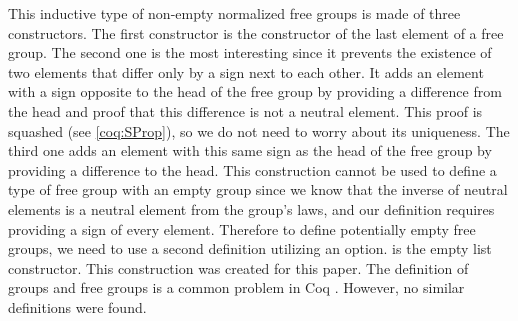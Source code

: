 This inductive type  of non-empty normalized free groups is made of three constructors. The first constructor  is the constructor of the last element of a free group. The second one  is the most interesting since it prevents the existence of two elements that differ only by a sign next to each other. It adds an element with a sign opposite to the head of the free group by providing a difference from the head and proof that this difference is not a neutral element. This proof is squashed (see \ref{coq:SProp}), so we do not need to worry about its uniqueness. The third one adds an element with this same sign as the head of the free group by providing a difference to the head. This construction cannot be used to define a type of free group with an empty group since we know that the inverse of neutral elements is a neutral element from the group's laws, and our definition requires providing a sign of every element. Therefore to define potentially empty free groups, we need to use a second definition utilizing an option.  is the empty list constructor. This construction was created for this paper. The definition of groups and free groups is a common problem in Coq \cite{GroupsCoq} \cite{FreeGroupsCoq}. However, no similar definitions were found. 

